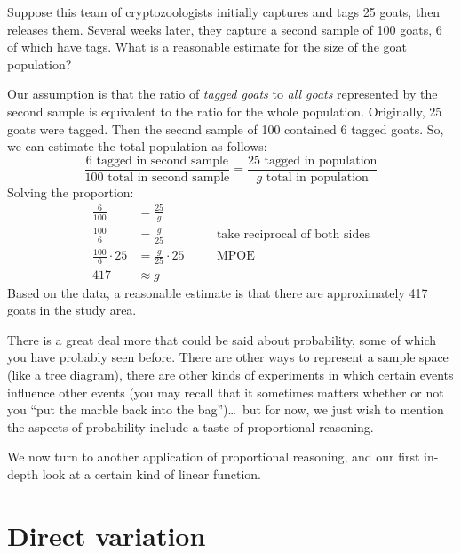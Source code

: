 \begin{boxex}
Suppose this team of cryptozoologists initially captures and tags 25 goats, then releases them. Several weeks later, they capture a second sample of 100 goats, 6 of which have tags. What is a reasonable estimate for the size of the goat population?

\bigskip{} Our assumption is that the ratio of \textit{tagged goats} to \textit{all goats} represented by the second sample is equivalent to the ratio for the whole population. Originally, 25 goats were tagged. Then the second sample of 100 contained 6 tagged goats. So, we can estimate the total population as follows:
\[\frac{6\text{ tagged in second sample}}{100\text{ total in second sample}} = \frac{25\text{ tagged in population}}{g \text{ total in population}}\]
Solving the proportion:
\[\begin{aligned}
\frac{6}{100} &= \frac{25}{g}
\\[2ex]
\frac{100}{6} &= \frac{g}{25}
&&\quad\text{take reciprocal of both sides}
\\[2ex]
\frac{100}{6} \cdot 25 &= \frac{g}{25} \cdot 25
&&\quad\text{MPOE}
\\[2ex]
417 &\approx g
\end{aligned}\]
Based on the data, a reasonable estimate is that there are approximately 417 goats in the study area.
\end{boxex}

There is a great deal more that could be said about probability, some of which you have probably seen before. There are other ways to represent a sample space  (like a tree diagram), there are other kinds of experiments in which certain events influence other events (you may recall that it sometimes matters whether or not you ``put the marble back into the bag'')\ldots\ but for now, we just wish to mention the aspects of probability include a taste of proportional reasoning.

We now turn to another application of proportional reasoning, and our first in-depth look at a certain kind of linear function.

\section{Direct variation}
\label{sec:directvar}


